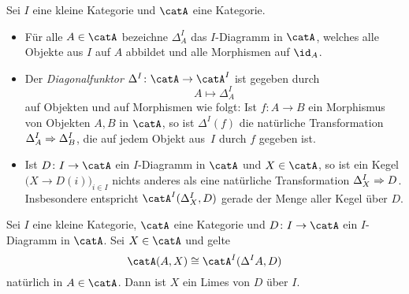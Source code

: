 \begin{thErinnerDef}[Diagonalfunktor]
    Sei $I$ eine kleine Kategorie und $\catA$ eine Kategorie.
    \begin{itemize}
        \item 
            Für alle $A\in\catA$ bezeichne $\Delta^I_A$ das $I$-Diagramm in
            $\catA$, welches alle Objekte aus $I$ auf $A$ abbildet und alle
            Morphismen auf $\id_A$.
            
        \item
            Der \emph{Diagonalfunktor $\Delta^I\colon\catA\to\catA^I$} ist 
            gegeben durch
            \[ A\mapsto \Delta^I_A \]
            auf Objekten und auf Morphismen wie folgt: Ist $f\colon A\to B$
            ein Morphismus von Objekten $A,B$ in $\catA$, so ist $\Delta^I(f)$
            die natürliche Transformation $\Delta^I_A \mathrel{\Rightarrow} \Delta^I_B$,
            die auf jedem Objekt aus~$I$ durch $f$ gegeben ist.
            
        \item
            Ist $D\colon I\to\catA$ ein $I$-Diagramm in $\catA$ und $X\in\catA$,
            so ist ein Kegel $\bigl( X \to D(i) \bigr)_{i\in I}$ nichts anderes
            als eine natürliche Transformation $\Delta^I_X \mathrel{\Rightarrow} D$.
            Insbesondere entspricht $\catA^I(\Delta^I_X, D)$ gerade der Menge aller
            Kegel über $D$.
    \end{itemize}
\end{thErinnerDef}

\begin{thLemma}
    \label{ch3:limesviadiagrammkategorie}
    Sei $I$ eine kleine Kategorie, $\catA$ eine Kategorie und $D\colon
    I\to\catA$ ein $I$-Diagramm in $\catA$. Sei $X\in\catA$ und gelte
    \[ \catA(A,X) \cong \catA^I(\Delta^I A, D) \]
    natürlich in $A\in\catA$. Dann ist $X$ ein Limes von $D$ über $I$.
\end{thLemma}


